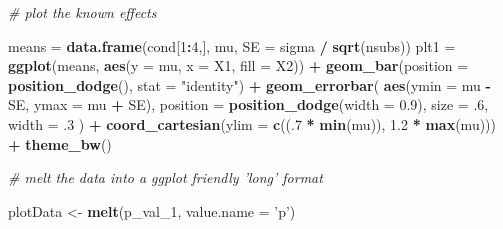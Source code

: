 \documentclass[
]{book}
\newenvironment{Shaded}{\begin{snugshade}}{\end{snugshade}}
\newcommand{\CommentTok}[1]{\textcolor[rgb]{0.56,0.35,0.01}{\textit{#1}}}
\newcommand{\DataTypeTok}[1]{\textcolor[rgb]{0.13,0.29,0.53}{#1}}
\newcommand{\DecValTok}[1]{\textcolor[rgb]{0.00,0.00,0.81}{#1}}
\newcommand{\FloatTok}[1]{\textcolor[rgb]{0.00,0.00,0.81}{#1}}
\newcommand{\KeywordTok}[1]{\textcolor[rgb]{0.13,0.29,0.53}{\textbf{#1}}}
\newcommand{\NormalTok}[1]{#1}
\newcommand{\OperatorTok}[1]{\textcolor[rgb]{0.81,0.36,0.00}{\textbf{#1}}}
\newcommand{\StringTok}[1]{\textcolor[rgb]{0.31,0.60,0.02}{#1}}
\begin{document}
\begin{Shaded}
\begin{Highlighting}[]
\CommentTok{# plot the known effects}

 
\NormalTok{means =}\StringTok{ }\KeywordTok{data.frame}\NormalTok{(cond[}\DecValTok{1}\OperatorTok{:}\DecValTok{4}\NormalTok{,], mu, }\DataTypeTok{SE =}\NormalTok{ sigma }\OperatorTok{/}\StringTok{ }\KeywordTok{sqrt}\NormalTok{(nsubs))}
\NormalTok{plt1 =}\StringTok{ }\KeywordTok{ggplot}\NormalTok{(means, }\KeywordTok{aes}\NormalTok{(}\DataTypeTok{y =}\NormalTok{ mu, }\DataTypeTok{x =}\NormalTok{ X1, }\DataTypeTok{fill =}\NormalTok{ X2)) }\OperatorTok{+}
\KeywordTok{geom_bar}\NormalTok{(}\DataTypeTok{position =} \KeywordTok{position_dodge}\NormalTok{(), }\DataTypeTok{stat =} \StringTok{"identity"}\NormalTok{) }\OperatorTok{+}
\KeywordTok{geom_errorbar}\NormalTok{(}
\KeywordTok{aes}\NormalTok{(}\DataTypeTok{ymin =}\NormalTok{ mu }\OperatorTok{-}\StringTok{ }\NormalTok{SE, }\DataTypeTok{ymax =}\NormalTok{ mu }\OperatorTok{+}\StringTok{ }\NormalTok{SE),}
\DataTypeTok{position =} \KeywordTok{position_dodge}\NormalTok{(}\DataTypeTok{width =} \FloatTok{0.9}\NormalTok{),}
\DataTypeTok{size =} \FloatTok{.6}\NormalTok{,}
\DataTypeTok{width =} \FloatTok{.3}
\NormalTok{) }\OperatorTok{+}
\KeywordTok{coord_cartesian}\NormalTok{(}\DataTypeTok{ylim =} \KeywordTok{c}\NormalTok{((.}\DecValTok{7} \OperatorTok{*}\StringTok{ }\KeywordTok{min}\NormalTok{(mu)), }\FloatTok{1.2} \OperatorTok{*}\StringTok{ }\KeywordTok{max}\NormalTok{(mu))) }\OperatorTok{+}
\KeywordTok{theme_bw}\NormalTok{()}

\CommentTok{# melt the data into a ggplot friendly 'long' format}

\NormalTok{plotData <-}\StringTok{ }\KeywordTok{melt}\NormalTok{(p_val_}\DecValTok{1}\NormalTok{, }\DataTypeTok{value.name =} \StringTok{'p'}\NormalTok{)}


\end{Highlighting}
\end{Shaded}
\end{document}
